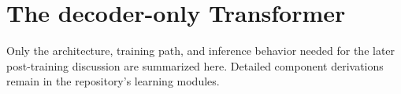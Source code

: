 \section{The decoder-only Transformer}

Only the architecture, training path, and inference behavior needed for the later
post-training discussion are summarized here. Detailed component derivations remain in
the repository's learning modules.



